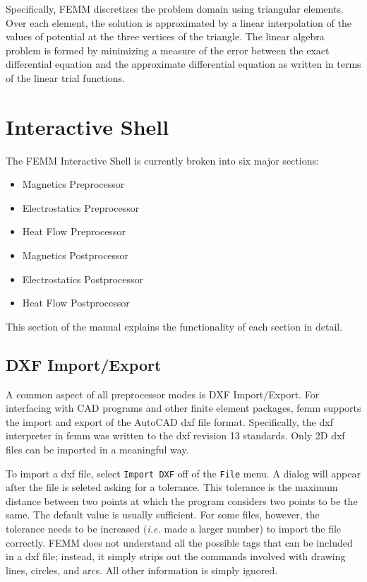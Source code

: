 \documentclass[12pt]{report}
\begin{document}
Specifically, FEMM discretizes the problem domain using triangular
elements. Over each element, the solution is approximated by a
linear interpolation of the values of potential at the three
vertices of the triangle. The linear algebra problem is formed by
minimizing a measure of the error between the exact differential
equation and the approximate differential equation as written in
terms of the linear trial functions.

\chapter{Interactive Shell}

The FEMM Interactive Shell is currently broken into six major
sections:
\begin{itemize}
\item Magnetics Preprocessor
\item Electrostatics Preprocessor
\item Heat Flow Preprocessor
\item Magnetics Postprocessor
\item Electrostatics Postprocessor
\item Heat Flow Postprocessor
\end{itemize}
This section of the manual explains the functionality of each
section in detail.

\section{DXF Import/Export}

A common aspect of all preprocessor modes is DXF Import/Export. For
interfacing with CAD programs and other finite element packages,
femm supports the import and export of the AutoCAD dxf file format.
Specifically, the dxf interpreter in femm was written to the dxf
revision 13 standards. Only 2D dxf files can be imported in a
meaningful way.

To import a dxf file, select \texttt{Import DXF} off of the
\texttt{File} menu. A dialog will appear after the file is seleted
asking for a tolerance. This tolerance is the maximum distance
between two points at which the program considers two points to be
the same. The default value is usually sufficient. For some files,
however, the tolerance needs to be increased ({\em i.e.} made a
larger number) to import the file correctly. FEMM does not
understand all the possible tags that can be included in a dxf
file; instead, it simply strips out the commands involved with
drawing lines, circles, and arcs. All other information is simply
ignored.
\end{document}
